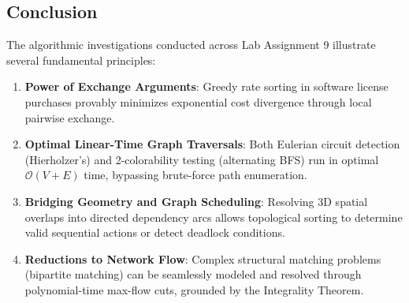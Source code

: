 \documentclass[12pt]{article}
\begin{document}
\begin{table}[H]
\centering
\caption{Comprehensive Algorithmic Bounds for Lab Assignment 9.}
\label{tab:lab9_summary}
\vspace{0.2cm}
\end{table}

\subsection*{Conclusion}
The algorithmic investigations conducted across Lab Assignment 9 illustrate several fundamental principles:
\begin{enumerate}
    \item \textbf{Power of Exchange Arguments}: Greedy rate sorting in software license purchases provably minimizes exponential cost divergence through local pairwise exchange.
    \item \textbf{Optimal Linear-Time Graph Traversals}: Both Eulerian circuit detection (Hierholzer's) and 2-colorability testing (alternating BFS) run in optimal $\mathcal{O}(V + E)$ time, bypassing brute-force path enumeration.
    \item \textbf{Bridging Geometry and Graph Scheduling}: Resolving 3D spatial overlaps into directed dependency arcs allows topological sorting to determine valid sequential actions or detect deadlock conditions.
    \item \textbf{Reductions to Network Flow}: Complex structural matching problems (bipartite matching) can be seamlessly modeled and resolved through polynomial-time max-flow cuts, grounded by the Integrality Theorem.
\end{enumerate}
\end{document}
